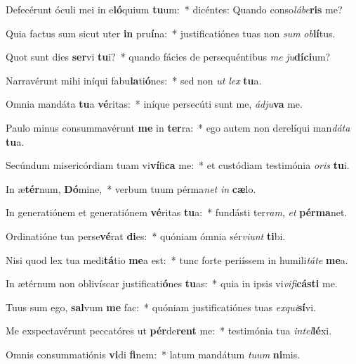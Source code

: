 \item Defecérunt óculi mei in e\textbf{ló}quium \textbf{tu}um:~* dicéntes: Quando conso\textit{lá}\textit{be}\textbf{ris} me?
\item Quia factus sum sicut uter \textbf{in} pru\textbf{í}na:~* justificatiónes tuas non \textit{sum} \textit{ob}\textbf{lí}tus.
\item Quot sunt dies \textbf{ser}vi \textbf{tu}i?~* quando fácies de persequéntibus \textit{me} \textit{ju}\textbf{dí}\textbf{ci}um?
\item Narravérunt mihi iníqui fabu\textbf{la}ti\textbf{ó}nes:~* sed non \textit{ut} \textit{lex} \textbf{tu}a.
\item Omnia mandáta \textbf{tu}a \textbf{vé}ritas:~* iníque persecúti sunt me, \textit{ád}\textit{ju}\textbf{va} me.
\item Paulo minus consummavérunt \textbf{me} in \textbf{ter}ra:~* ego autem non derelíqui man\textit{dá}\textit{ta} \textbf{tu}a.
\item Secúndum misericórdiam tuam vi\textbf{ví}fi\textbf{ca} me:~* et custódiam testimónia \textit{o}\textit{ris} \textbf{tu}i.
\item In æ\textbf{tér}num, \textbf{Dó}mine,~* verbum tuum pérma\textit{net} \textit{in} \textbf{cæ}lo.
\item In generatiónem et generatiónem \textbf{vé}ritas \textbf{tu}a:~* fundásti ter\textit{ram}, \textit{et} \textbf{pér}\textbf{ma}net.
\item Ordinatióne tua perse\textbf{vé}rat \textbf{di}es:~* quóniam ómnia sér\textit{vi}\textit{unt} \textbf{ti}bi.
\item Nisi quod lex tua medi\textbf{tá}tio \textbf{me}a est:~* tunc forte periíssem in humili\textit{tá}\textit{te} \textbf{me}a.
\item In ætérnum non oblivíscar justificati\textbf{ó}nes \textbf{tu}as:~* quia in ipsis vi\textit{vi}\textit{fi}\textbf{cás}\textbf{ti} me.
\item Tuus sum ego, \textbf{sal}vum \textbf{me} fac:~* quóniam justificatiónes tuas \textit{ex}\textit{qui}\textbf{sí}vi.
\item Me exspectavérunt peccatóres ut \textbf{pér}de\textbf{rent} me:~* testimónia tua \textit{in}\textit{tel}\textbf{lé}xi.
\item Omnis consummatiónis \textbf{vi}di \textbf{fi}nem:~* latum mandátum \textit{tu}\textit{um} \textbf{ni}mis.
